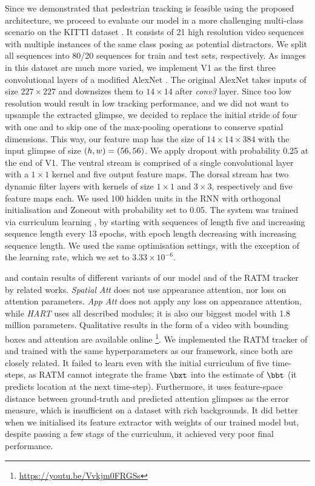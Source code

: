     Since we demonstrated that pedestrian tracking is feasible using the proposed architecture, we proceed to evaluate our model in a more challenging multi-class scenario on the KITTI dataset \cite{Geiger2013}. It consists of 21 high resolution video sequences with multiple instances of the same class posing as potential distractors. We split all sequences into 80/20 sequences for train and test sets, respectively. As images in this dataset are much more varied, we implement V1 as the first three convolutional layers of a modified AlexNet \cite{Krizhevsky2012}. The original AlexNet takes inputs of size $227 \times 227$ and downsizes them to $14 \times 14$ after \emph{conv3} layer. Since too low resolution would result in low tracking performance, and we did not want to upsample the extracted glimpse, we decided to replace the initial stride of four with one and to skip one of the max-pooling operations to conserve spatial dimensions. This way, our feature map has the size of $14 \times 14 \times 384$ with the input glimpse of size $(h, w) = (56, 56)$. We apply dropout with probability 0.25 at the end of V1. The ventral stream is comprised of a single convolutional layer with a $1 \times 1$ kernel and five output feature maps. The dorsal stream has two dynamic filter layers with kernels of size $1 \times 1$ and $3 \times 3$, respectively and five feature maps each. We used 100 hidden units in the RNN with orthogonal initialisation and Zoneout \cite{Krueger2016} with probability set to 0.05. The system was trained via curriculum learning \cite{Bengio2009}, by starting with sequences of length five and increasing sequence length every 13 epochs, with epoch length decreasing with increasing sequence length. We used the same optimisation settings, with the exception of the learning rate, which we set to $3.33 \times 10^{-6}$.
    
    
     and  contain results of different variants of our model and of the RATM tracker by \citet{Kahou2015ratm} related works. \emph{Spatial Att} does not use appearance attention, nor loss on attention parameters. \emph{App Att} does not apply any loss on appearance attention, while \emph{HART} uses all described modules; it is also our biggest model with 1.8 million parameters. Qualitative results in the form of a video with bounding boxes and attention are available online \footnote{\url{https://youtu.be/Vvkjm0FRGSs}}. We implemented the RATM tracker of \citet{Kahou2015ratm} and trained with the same hyperparameters as our framework, since both are closely related. It failed to learn even with the initial curriculum of five time-steps, as RATM cannot integrate the frame $\bxt$ into the estimate of $\bbt$ (it predicts location at the next time-step). Furthermore, it uses feature-space distance between ground-truth and predicted attention glimpses as the error measure, which is insufficient on a dataset with rich backgrounds. It did better when we initialised its feature extractor with weights of our trained model but, despite passing a few stags of the curriculum, it achieved very poor final performance. 
    
